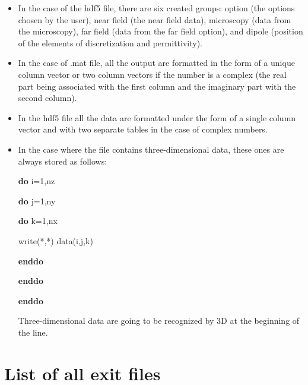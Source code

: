 \begin{itemize}

\item In the case of the hdf5 file, there are six created groups:
  option (the options chosen by the user), near field (the near field
  data), microscopy (data from the microscopy), far field (data from
  the far field option), and dipole (position of the elements of
  discretization and permittivity).

\item In the case of .mat file, all the output are formatted in the
  form of a unique column vector or two column vectors if the number
  is a complex (the real part being associated with the first column
  and the imaginary part with the second column).

\item In the hdf5 file all the data are formatted under the form of a
  single column vector and with two separate tables in the case of
  complex numbers.

\item In the case where the file contains three-dimensional data,
  these ones are always stored as follows:

\hspace{5mm} {\bf do} i=1,nz

  \hspace{10mm} {\bf do} j=1,ny

 \hspace{15mm} {\bf do} k=1,nx

      \hspace{20mm}  write(*,*) data(i,j,k)
         
   \hspace{15mm} {\bf enddo}

  \hspace{10mm} {\bf enddo}

 \hspace{5mm} {\bf enddo}

 Three-dimensional data are going to be recognized by 3D at the
 beginning of the line.
\end{itemize}

\section{List of all exit files}


